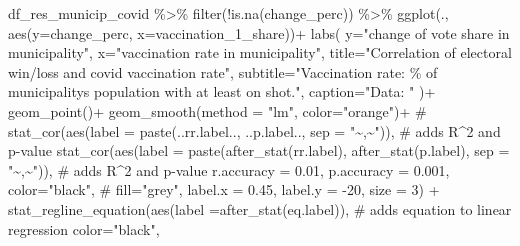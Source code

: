 \documentclass[
  letterpaper,
  DIV=11,
  numbers=noendperiod,
  oneside]{scrartcl}
\newenvironment{Shaded}{\begin{snugshade}}{\end{snugshade}}
\newcommand{\AttributeTok}[1]{\textcolor[rgb]{0.40,0.45,0.13}{#1}}
\newcommand{\CommentTok}[1]{\textcolor[rgb]{0.37,0.37,0.37}{#1}}
\newcommand{\DecValTok}[1]{\textcolor[rgb]{0.68,0.00,0.00}{#1}}
\newcommand{\FloatTok}[1]{\textcolor[rgb]{0.68,0.00,0.00}{#1}}
\newcommand{\FunctionTok}[1]{\textcolor[rgb]{0.28,0.35,0.67}{#1}}
\newcommand{\NormalTok}[1]{\textcolor[rgb]{0.00,0.23,0.31}{#1}}
\newcommand{\SpecialCharTok}[1]{\textcolor[rgb]{0.37,0.37,0.37}{#1}}
\newcommand{\StringTok}[1]{\textcolor[rgb]{0.13,0.47,0.30}{#1}}
\begin{document}
\begin{Shaded}
\begin{Highlighting}[]
\NormalTok{df\_res\_municip\_covid }\SpecialCharTok{\%\textgreater{}\%} 
  \FunctionTok{filter}\NormalTok{(}\SpecialCharTok{!}\FunctionTok{is.na}\NormalTok{(change\_perc)) }\SpecialCharTok{\%\textgreater{}\%} 
  \FunctionTok{ggplot}\NormalTok{(., }\FunctionTok{aes}\NormalTok{(}\AttributeTok{y=}\NormalTok{change\_perc, }
                \AttributeTok{x=}\NormalTok{vaccination\_1\_share))}\SpecialCharTok{+}
  \FunctionTok{labs}\NormalTok{(}
    \AttributeTok{y=}\StringTok{"change of vote share in municipality"}\NormalTok{,}
    \AttributeTok{x=}\StringTok{"vaccination rate in municipality"}\NormalTok{,}
    \AttributeTok{title=}\StringTok{"Correlation of electoral win/loss and covid vaccination rate"}\NormalTok{,}
    \AttributeTok{subtitle=}\StringTok{"Vaccination rate: \% of municipality\textquotesingle{}s population with at least on shot."}\NormalTok{,}
    \AttributeTok{caption=}\StringTok{"Data: "}
\NormalTok{  )}\SpecialCharTok{+}
  \FunctionTok{geom\_point}\NormalTok{()}\SpecialCharTok{+}
  \FunctionTok{geom\_smooth}\NormalTok{(}\AttributeTok{method =} \StringTok{"lm"}\NormalTok{, }\AttributeTok{color=}\StringTok{"orange"}\NormalTok{)}\SpecialCharTok{+}
  \CommentTok{\# stat\_cor(aes(label = paste(..rr.label.., ..p.label.., sep = "\textasciitilde{}\textasciigrave{},\textasciigrave{}\textasciitilde{}")), \# adds R\^{}2 and p{-}value}
  \FunctionTok{stat\_cor}\NormalTok{(}\FunctionTok{aes}\NormalTok{(}\AttributeTok{label =} \FunctionTok{paste}\NormalTok{(}\FunctionTok{after\_stat}\NormalTok{(rr.label), }\FunctionTok{after\_stat}\NormalTok{(p.label), }\AttributeTok{sep =} \StringTok{"\textasciitilde{}\textasciigrave{},\textasciigrave{}\textasciitilde{}"}\NormalTok{)), }\CommentTok{\# adds R\^{}2 and p{-}value}
           \AttributeTok{r.accuracy =} \FloatTok{0.01}\NormalTok{,}
           \AttributeTok{p.accuracy =} \FloatTok{0.001}\NormalTok{,}
           \AttributeTok{color=}\StringTok{"black"}\NormalTok{,}
          \CommentTok{\# fill="grey",}
           \AttributeTok{label.x =} \FloatTok{0.45}\NormalTok{, }
           \AttributeTok{label.y =} \SpecialCharTok{{-}}\DecValTok{20}\NormalTok{, }
           \AttributeTok{size =} \DecValTok{3}\NormalTok{) }\SpecialCharTok{+}
  \FunctionTok{stat\_regline\_equation}\NormalTok{(}\FunctionTok{aes}\NormalTok{(}\AttributeTok{label =}\FunctionTok{after\_stat}\NormalTok{(eq.label)), }\CommentTok{\# adds equation to linear regression}
                        \AttributeTok{color=}\StringTok{"black"}\NormalTok{,}

\end{Highlighting}
\end{Shaded}
\end{document}
